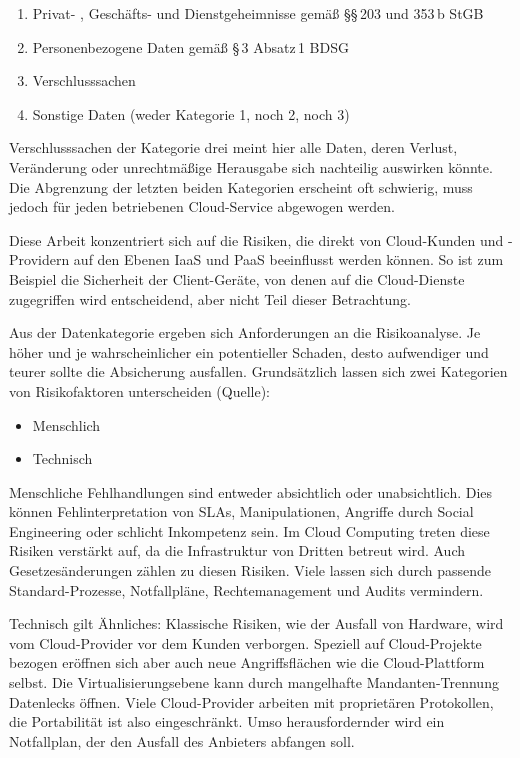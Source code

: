 \begin{enumerate}
	\item Privat- , Geschäfts- und Dienstgeheimnisse gemäß §§\,203 und 353\,b StGB
	\item Personenbezogene Daten gemäß §\,3 Absatz\,1 BDSG
	\item Verschlusssachen
	\item Sonstige Daten (weder Kategorie 1, noch 2, noch 3)	
\end{enumerate}

\noindent
Verschlusssachen der Kategorie drei meint hier alle Daten, deren Verlust, Veränderung oder unrechtmäßige Herausgabe sich nachteilig auswirken könnte. Die Abgrenzung der letzten beiden Kategorien erscheint oft schwierig, muss jedoch für jeden betriebenen Cloud-Service abgewogen werden.

Diese Arbeit konzentriert sich auf die Risiken, die direkt von Cloud-Kunden und -Providern auf den Ebenen IaaS und PaaS beeinflusst werden können. So ist zum Beispiel die Sicherheit der Client-Geräte, von denen auf die Cloud-Dienste zugegriffen wird entscheidend, aber nicht Teil dieser Betrachtung.

Aus der Datenkategorie ergeben sich Anforderungen an die Risikoanalyse. Je höher und je wahrscheinlicher ein potentieller Schaden, desto aufwendiger und teurer sollte die Absicherung ausfallen. Grundsätzlich lassen sich zwei Kategorien von Risikofaktoren unterscheiden (Quelle):
\begin{itemize}
	\item Menschlich
	\item Technisch
\end{itemize}

\noindent Menschliche Fehlhandlungen sind entweder absichtlich oder unabsichtlich. Dies können Fehlinterpretation von SLAs, Manipulationen, Angriffe durch Social Engineering oder schlicht Inkompetenz sein. Im Cloud Computing treten diese Risiken verstärkt auf, da die Infrastruktur von Dritten betreut wird. Auch Gesetzesänderungen zählen zu diesen Risiken. Viele lassen sich durch passende Standard-Prozesse, Notfallpläne, Rechtemanagement und Audits vermindern.

Technisch gilt Ähnliches: Klassische Risiken, wie der Ausfall von Hardware, wird vom Cloud-Provider vor dem Kunden verborgen. Speziell auf Cloud-Projekte bezogen eröffnen sich aber auch neue Angriffsflächen wie die Cloud-Plattform selbst. Die Virtualisierungsebene kann durch mangelhafte Mandanten-Trennung Datenlecks öffnen. Viele Cloud-Provider arbeiten mit proprietären Protokollen, die Portabilität ist also eingeschränkt. Umso herausfordernder wird ein Notfallplan, der den Ausfall des Anbieters abfangen soll.

